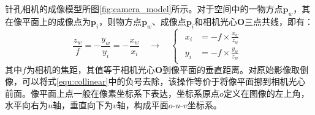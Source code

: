 针孔相机的成像模型所图\ref{fig:camera_model}所示。对于空间中的一物方点$\boldsymbol{p}_w$，其在像平面上的成像点为$\boldsymbol{p}_i$，则物方点$\boldsymbol{p}_w$、成像点$\boldsymbol{p}_i$和相机光心$\boldsymbol{O}$三点共线，即有：
\begin{equation}
  \label{equ:collinear}
  \frac{z_w}{f}=-\frac{y_w}{y_i}=-\frac{x_w}{x_i}\quad\to\quad
  \begin{cases}
    \begin{aligned}
      x_i & =-f\times\frac{x_w}{z_w} \\
      y_i & =-f\times\frac{y_w}{z_w}
    \end{aligned}
  \end{cases}
\end{equation}
其中$f$为相机的焦距，其值等于相机光心$\boldsymbol{O}$到像平面的垂直距离。对原始影像取倒像，可以将式\ref{equ:collinear}中的负号去除，该操作等价于将像平面挪到相机光心前面。像平面上点一般在像素坐标系下表达，坐标系原点$o$定义在图像的左上角，水平向右为$u$轴，垂直向下为$v$轴，构成平面$o$-$u$-$v$坐标系。

